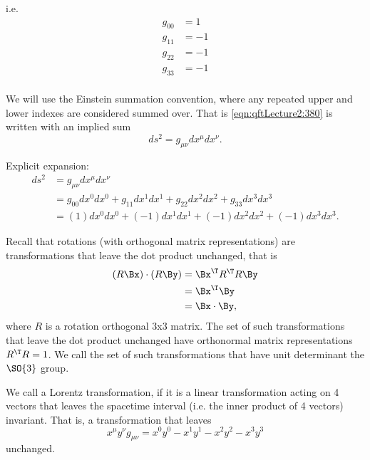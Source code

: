 i.e.
\begin{equation}\label{eqn:qftLecture2:420}
\begin{aligned}
g_{00} &= 1 \\
g_{11} &= -1 \\
g_{22} &= -1 \\
g_{33} &= -1 \\
\end{aligned}
\end{equation}

We will use the Einstein summation convention, where any repeated upper and lower indexes are considered summed over.  That is \cref{eqn:qftLecture2:380} is written with an implied sum
\begin{equation}\label{eqn:qftLecture2:440}
ds^2 = g_{\mu\nu} dx^\mu dx^\nu.
\end{equation}

Explicit expansion:
\begin{equation}\label{eqn:qftLecture2:460}
\begin{aligned}
ds^2 
&= g_{\mu\nu} dx^\mu dx^\nu \\
&=
g_{00} dx^0 dx^0
+g_{11} dx^1 dx^1
+g_{22} dx^2 dx^2
+g_{33} dx^3 dx^3 \\
&=
(1) dx^0 dx^0
+ (-1) dx^1 dx^1
+ (-1) dx^2 dx^2
+ (-1) dx^3 dx^3.
\end{aligned}
\end{equation}

Recall that rotations (with orthogonal matrix representations) are transformations that leave the dot product unchanged, that is
\begin{equation}\label{eqn:qftLecture2:480}
\begin{aligned}
(R \Bx) \cdot (R \By)
&= \Bx^\T R^\T R \By \\
&= \Bx^\T \By \\
&= \Bx \cdot \By,
\end{aligned}
\end{equation}
%
where \( R \) is a rotation orthogonal 3x3 matrix.  The set of such transformations that leave the dot product unchanged have orthonormal matrix representations \( R^\T R = 1 \).  We call the set of such transformations that have unit determinant the \(\SO{3}\) group.

We call a Lorentz transformation, if it is a linear transformation acting on 4 vectors that leaves the spacetime interval (i.e. the inner product of 4 vectors) invariant.  That is, a transformation that leaves
\begin{equation}\label{eqn:qftLecture2:500}
x^\mu y^\nu g_{\mu\nu} = x^0 y^0 - x^1 y^1 - x^2 y^2 - x^3 y^3
\end{equation}
unchanged.

